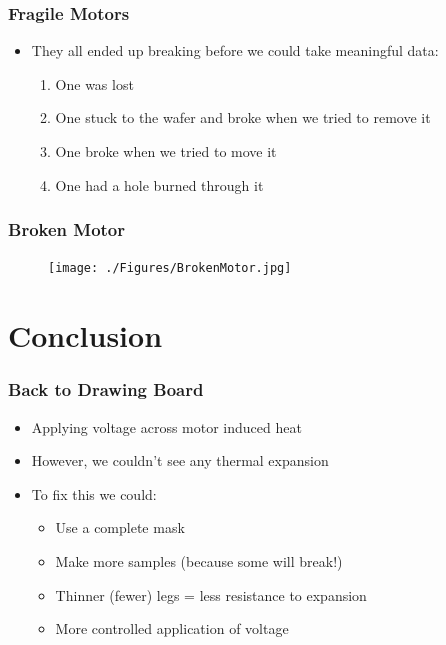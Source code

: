 \documentclass[11pt]{beamer}
\theoremstyle{definition}
\begin{document}
  \begin{frame} \frametitle{Fragile Motors}
    \begin{itemize}[<+->]
      \item They all ended up breaking before we could take meaningful data:
      \begin{enumerate}
        \item  One was lost
        \item One stuck to the wafer and broke when we tried to remove it
        \item One broke when we tried to move it
        \item One had a hole burned through it
      \end{enumerate}
    \end{itemize}
  \end{frame}

  \begin{frame} \frametitle{Broken Motor}
      \begin{figure}[ht]
          \centering
          \texttt{[image: ./Figures/BrokenMotor.jpg]}
          \label{fig:sharpie}
      \end{figure}
    \end{frame}

\section{Conclusion} \label{sec:conclusion}

  \begin{frame} \frametitle{Back to Drawing Board}
    \begin{itemize}[<+->]
      \item Applying voltage across motor induced heat
      \item However, we couldn't see any thermal expansion
      \item To fix this we could:
      \begin{itemize}
        \item Use a complete mask
        \item Make more samples (because some will break!)
        \item Thinner (fewer) legs = less resistance to expansion
        \item More controlled application of voltage
      \end{itemize}
    \end{itemize}
  \end{frame}
\end{document}
